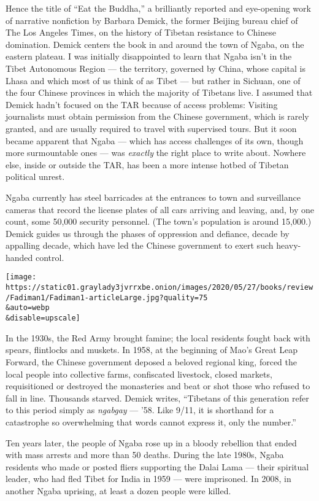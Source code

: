 Hence the title of ``Eat the Buddha,'' a brilliantly reported and
eye-opening work of narrative nonfiction by Barbara Demick, the former
Beijing bureau chief of The Los Angeles Times, on the history of Tibetan
resistance to Chinese domination. Demick centers the book in and around
the town of Ngaba, on the eastern plateau. I was initially disappointed
to learn that Ngaba isn't in the Tibet Autonomous Region --- the
territory, governed by China, whose capital is Lhasa and which most of
us think of as Tibet --- but rather in Sichuan, one of the four Chinese
provinces in which the majority of Tibetans live. I assumed that Demick
hadn't focused on the TAR because of access problems: Visiting
journalists must obtain permission from the Chinese government, which is
rarely granted, and are usually required to travel with supervised
tours. But it soon became apparent that Ngaba --- which has access
challenges of its own, though more surmountable ones --- was
\emph{exactly} the right place to write about. Nowhere else, inside or
outside the TAR, has been a more intense hotbed of Tibetan political
unrest.

Ngaba currently has steel barricades at the entrances to town and
surveillance cameras that record the license plates of all cars arriving
and leaving, and, by one count, some 50,000 security personnel. (The
town's population is around 15,000.) Demick guides us through the phases
of oppression and defiance, decade by appalling decade, which have led
the Chinese government to exert such heavy-handed control.

\texttt{[image: https://static01.graylady3jvrrxbe.onion/images/2020/05/27/books/review/Fadiman1/Fadiman1-articleLarge.jpg?quality=75\\\&auto=webp\\\&disable=upscale]}

In the 1930s, the Red Army brought famine; the local residents fought
back with spears, flintlocks and muskets. In 1958, at the beginning of
Mao's Great Leap Forward, the Chinese government deposed a beloved
regional king, forced the local people into collective farms,
confiscated livestock, closed markets, requisitioned or destroyed the
monasteries and beat or shot those who refused to fall in line.
Thousands starved. Demick writes, ``Tibetans of this generation refer to
this period simply as \emph{ngabgay} --- '58. Like 9/11, it is shorthand
for a catastrophe so overwhelming that words cannot express it, only the
number.''

Ten years later, the people of Ngaba rose up in a bloody rebellion that
ended with mass arrests and more than 50 deaths. During the late 1980s,
Ngaba residents who made or posted fliers supporting the Dalai Lama ---
their spiritual leader, who had fled Tibet for India in 1959 --- were
imprisoned. In 2008, in another Ngaba uprising, at least a dozen people
were killed.

